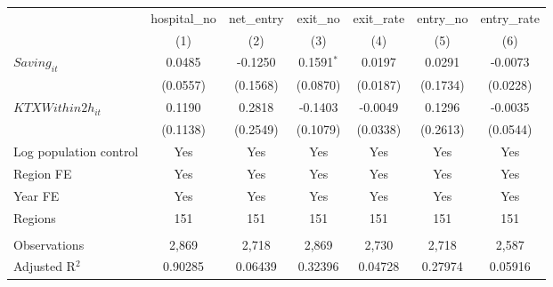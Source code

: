 \begingroup
\centering
\begin{tabular}{lcccccc}
   \toprule
                          & hospital\_no  & net\_entry  & exit\_no     & exit\_rate  & entry\_no  & entry\_rate \\    
                          & (1)           & (2)         & (3)          & (4)         & (5)        & (6)\\  
   \midrule 
   $Saving_{it}$          & 0.0485        & -0.1250     & 0.1591$^{*}$ & 0.0197      & 0.0291     & -0.0073\\   
                          & (0.0557)      & (0.1568)    & (0.0870)     & (0.0187)    & (0.1734)   & (0.0228)\\   
   $KTXWithin2h_{it}$     & 0.1190        & 0.2818      & -0.1403      & -0.0049     & 0.1296     & -0.0035\\   
                          & (0.1138)      & (0.2549)    & (0.1079)     & (0.0338)    & (0.2613)   & (0.0544)\\   
   Log population control & Yes           & Yes         & Yes          & Yes         & Yes        & Yes\\  
   Region FE              & Yes           & Yes         & Yes          & Yes         & Yes        & Yes\\  
   Year FE                & Yes           & Yes         & Yes          & Yes         & Yes        & Yes\\  
   Regions                & 151           & 151         & 151          & 151         & 151        & 151\\  
    \\
   Observations           & 2,869         & 2,718       & 2,869        & 2,730       & 2,718      & 2,587\\  
   Adjusted R$^2$         & 0.90285       & 0.06439     & 0.32396      & 0.04728     & 0.27974    & 0.05916\\  
   \bottomrule
\end{tabular}
\par\endgroup
